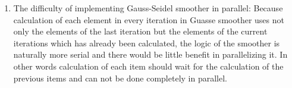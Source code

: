 \documentclass[letterpaper]{article}
\begin{document}
\begin{enumerate}
\item The difficulty of implementing Gauss-Seidel smoother in parallel:\newline
Because calculation of each element in every iteration in Guasse smoother uses
not only the elements of the last iteration but the elements of the current
iterations which has already been calculated, the logic of the smoother is
naturally more serial and there would be little benefit in parallelizing it. In other
words calculation of each item should wait for the calculation of the previous
items and can not be done completely in parallel.
\end{enumerate}
\end{document}
